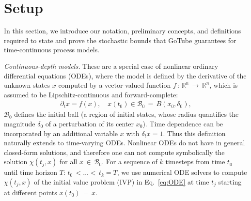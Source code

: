 \documentclass[letterpaper]{article} %
\newcommand{\R}{\mathbb{R}}
\newcommand{\rd}{\delta}
\newcommand{\calB}{\mathcal{B}}
\begin{document}
\section{Setup}
In this section, we introduce our notation, preliminary concepts, and definitions required to state and prove the stochastic bounds that GoTube guarantees for time-continuous process models.

\emph{Continuous-depth models.} These are a special case of non\-li\-near ordinary differential equations (ODEs), where the model is defined by the derivative of the unknown states $x$ computed by a vector-valued function $f\,{:}\,\R^n\,{\rightarrow}\,\R^n$, which is assumed to be Lipschitz-continuous and forward-complete:
\begin{align}\label{eq:ODE}
    \partial_t x = f(x),\quad x(t_0) \in \calB_0\,{=}\,B(x_0, \rd_0),
\end{align}
$\calB_0$ defines the initial ball (a region of initial states, whose radius quantifies the magnitude $\rd_0$ of a perturbation of its center $x_0$).
Time dependence can be incorporated by an additional variable $x$ with $\delta_t x = 1$. Thus this definition naturally extends to time-varying ODEs. Nonlinear ODEs do not have in general closed-form solutions, and therefore one can not compute symbolically the solution $\chi(t_j, x)$ for all $x\,{\in}\,\calB_0$. For a sequence of $k$ timesteps from time $t_0$ until time horizon $T$: $t_0\,{<}\dots{<}\,t_k = T$, we use numerical ODE solvers to compute $\chi(t_j, x)$ of the initial value problem (IVP) in Eq.~\eqref{eq:ODE} at time $t_j$ starting at different points $x(t_0)\,{=}\,x$. 
\end{document}
